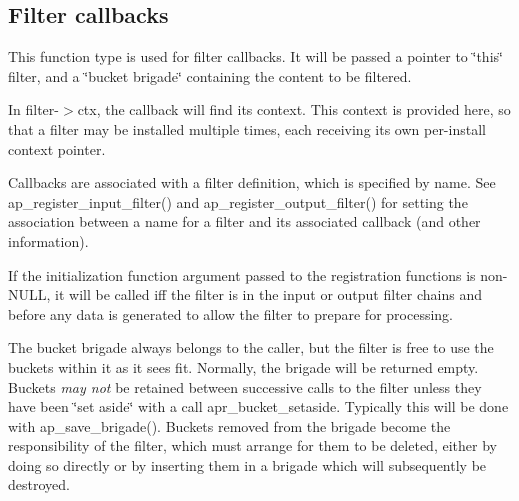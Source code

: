 \subsection*{Filter callbacks}
\label{_amgrp777bf418b46f9d0d34815f61b54b31e1}%
This function type is used for filter callbacks. It will be passed a pointer to \char`\"{}this\char`\"{} filter, and a \char`\"{}bucket brigade\char`\"{} containing the content to be filtered.

In filter-\/$>$ctx, the callback will find its context. This context is provided here, so that a filter may be installed multiple times, each receiving its own per-\/install context pointer.

Callbacks are associated with a filter definition, which is specified by name. See ap\+\_\+register\+\_\+input\+\_\+filter() and ap\+\_\+register\+\_\+output\+\_\+filter() for setting the association between a name for a filter and its associated callback (and other information).

If the initialization function argument passed to the registration functions is non-\/\+N\+U\+LL, it will be called iff the filter is in the input or output filter chains and before any data is generated to allow the filter to prepare for processing.

The bucket brigade always belongs to the caller, but the filter is free to use the buckets within it as it sees fit. Normally, the brigade will be returned empty. Buckets {\itshape may not} be retained between successive calls to the filter unless they have been \char`\"{}set aside\char`\"{} with a call apr\+\_\+bucket\+\_\+setaside. Typically this will be done with ap\+\_\+save\+\_\+brigade(). Buckets removed from the brigade become the responsibility of the filter, which must arrange for them to be deleted, either by doing so directly or by inserting them in a brigade which will subsequently be destroyed.


